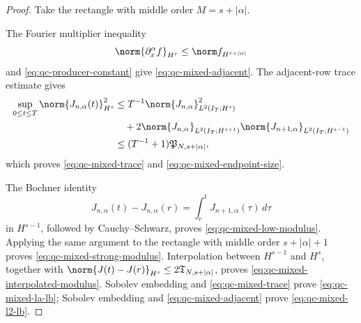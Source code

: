 \begin{proof}
Take the rectangle with middle order \(M=s+|\alpha|\).
\begin{samepage}
The Fourier
multiplier inequality
\[
 \norm{\partial_x^\alpha f}_{H^r}
 \le \norm f_{H^{r+|\alpha|}}
\]
and \eqref{eq:qc-producer-constant} give
\eqref{eq:qc-mixed-adjacent}.
The adjacent-row trace estimate gives
\begin{align*}
 \sup_{0\le t\le T}\norm{J_{n,\alpha}(t)}_{H^s}^2
 &\le T^{-1}\norm{J_{n,\alpha}}_{L^2(I_T;H^s)}^2\\
 &\quad+2\norm{J_{n,\alpha}}_{L^2(I_T;H^{s+1})}
          \norm{J_{n+1,\alpha}}_{L^2(I_T;H^{s-1})}\\
 &\le (T^{-1}+1)\mathfrak P_{N,s+|\alpha|},
\end{align*}
which proves \eqref{eq:qc-mixed-trace} and
\eqref{eq:qc-mixed-endpoint-size}.
\par
\end{samepage}
The Bochner identity
\[
 J_{n,\alpha}(t)-J_{n,\alpha}(r)
 =\int_r^tJ_{n+1,\alpha}(\tau)\,d\tau
\]
in \(H^{s-1}\), followed by Cauchy--Schwarz, proves
\eqref{eq:qc-mixed-low-modulus}.  Applying the same argument to the rectangle
with middle order \(s+|\alpha|+1\) proves
\eqref{eq:qc-mixed-strong-modulus}.  Interpolation between
\(H^{s-1}\) and \(H^s\), together with
\(\norm{J(t)-J(r)}_{H^s}\le2\mathfrak T_{N,s+|\alpha|}\), proves
\eqref{eq:qc-mixed-interpolated-modulus}.  Sobolev embedding and
\eqref{eq:qc-mixed-trace} prove \eqref{eq:qc-mixed-la-lb}; Sobolev embedding
and \eqref{eq:qc-mixed-adjacent} prove \eqref{eq:qc-mixed-l2-lb}.
\end{proof}


